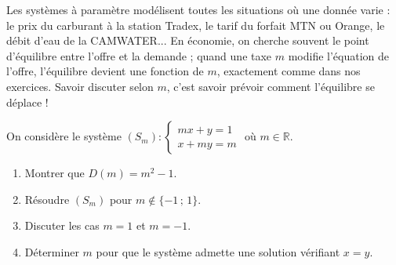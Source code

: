 \documentclass[11pt]{article}
\begin{document}
\begin{savaistu}
Les systèmes à paramètre modélisent toutes les situations où une donnée varie : le prix du carburant à la station Tradex, le tarif du forfait MTN ou Orange, le débit d'eau de la CAMWATER... En économie, on cherche souvent le point d'équilibre entre l'offre et la demande ; quand une taxe $m$ modifie l'équation de l'offre, l'équilibre devient une fonction de $m$, exactement comme dans nos exercices. Savoir discuter selon $m$, c'est savoir prévoir comment l'équilibre se déplace !
\end{savaistu}

\begin{exercice}
On considère le système $(S_m) : \begin{cases} mx + y = 1 \\ x + my = m \end{cases}$ où $m \in \mathbb{R}$.
\begin{enumerate}
\item Montrer que $D(m) = m^2 - 1$.
\item Résoudre $(S_m)$ pour $m \notin \{-1\,;\,1\}$.
\item Discuter les cas $m = 1$ et $m = -1$.
\item Déterminer $m$ pour que le système admette une solution vérifiant $x = y$.
\end{enumerate}
\end{exercice}
\end{document}
